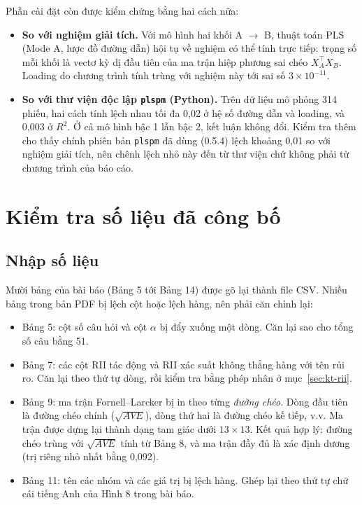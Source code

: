 Phần cài đặt còn được kiểm chứng bằng hai cách nữa:
\begin{itemize}
  \item \textbf{So với nghiệm giải tích.} Với mô hình hai khối A $\to$ B, thuật toán PLS (Mode A, lược đồ đường dẫn) hội tụ về nghiệm có thể tính trực tiếp: trọng số mỗi khối là vectơ kỳ dị đầu tiên của ma trận hiệp phương sai chéo $X_A^\top X_B$. Loading do chương trình tính trùng với nghiệm này tới sai số $3 \times 10^{-11}$.
  \item \textbf{So với thư viện độc lập \texttt{plspm} (Python).} Trên dữ liệu mô phỏng 314 phiếu, hai cách tính lệch nhau tối đa 0,02 ở hệ số đường dẫn và loading, và 0,003 ở $R^2$. Ở cả mô hình bậc 1 lẫn bậc 2, kết luận không đổi. Kiểm tra thêm cho thấy chính phiên bản \texttt{plspm} đã dùng (0.5.4) lệch khoảng 0,01 so với nghiệm giải tích, nên chênh lệch nhỏ này đến từ thư viện chứ không phải từ chương trình của báo cáo.
\end{itemize}

\section{Kiểm tra số liệu đã công bố}
\label{sec:kiem-tra}

\subsection{Nhập số liệu}

Mười bảng của bài báo (Bảng 5 tới Bảng 14) được gõ lại thành file CSV. Nhiều bảng trong bản PDF bị lệch cột hoặc lệch hàng, nên phải căn chỉnh lại:
\begin{itemize}
  \item Bảng 5: cột số câu hỏi và cột $\alpha$ bị đẩy xuống một dòng. Căn lại sao cho tổng số câu bằng 51.
  \item Bảng 7: các cột RII tác động và RII xác suất không thẳng hàng với tên rủi ro. Căn lại theo thứ tự dòng, rồi kiểm tra bằng phép nhân ở mục~\ref{sec:kt-rii}.
  \item Bảng 9: ma trận Fornell--Larcker bị in theo từng \emph{đường chéo}. Dòng đầu tiên là đường chéo chính ($\sqrt{AVE}$), dòng thứ hai là đường chéo kế tiếp, v.v. Ma trận được dựng lại thành dạng tam giác dưới $13 \times 13$. Kết quả hợp lý: đường chéo trùng với $\sqrt{AVE}$ tính từ Bảng 8, và ma trận đầy đủ là xác định dương (trị riêng nhỏ nhất bằng 0,092).
  \item Bảng 11: tên các nhóm và các giá trị bị lệch hàng. Ghép lại theo thứ tự chữ cái tiếng Anh của Hình 8 trong bài báo.
\end{itemize}

